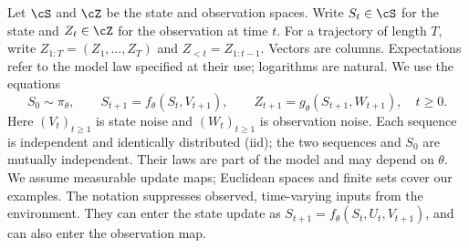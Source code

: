 \documentclass[11pt,twoside]{article}
\theoremstyle{definition}
\theoremstyle{remark}
\begin{document}
Let \(\cS\) and \(\cZ\) be the state and observation spaces. Write
\(S_t\in\cS\) for the state and \(Z_t\in\cZ\) for the observation at
time \(t\). For a trajectory of length \(T\), write
\(Z_{1:T}=(Z_1,\ldots,Z_T)\) and \(Z_{<t}=Z_{1:t-1}\).
Vectors are columns. Expectations refer to the model law specified at their
use; logarithms are natural. We use the equations
\begin{equation}
 S_0\sim\pi_\theta,\qquad
 S_{t+1}=f_\theta(S_t,V_{t+1}),\qquad
 Z_{t+1}=g_\theta(S_{t+1},W_{t+1}),\quad t\ge0.
 \label{eq:nonlinear-ssm}
\end{equation}
Here \((V_t)_{t\ge1}\) is state noise and \((W_t)_{t\ge1}\) is observation
noise. Each sequence is independent and identically distributed (iid);
the two sequences and \(S_0\) are mutually independent. Their laws are part of the model
and may depend on \(\theta\).
We assume measurable update maps; Euclidean spaces and finite sets cover
our examples.
The notation suppresses observed, time-varying inputs from the environment.
They can enter the state update as
\(S_{t+1}=f_\theta(S_t,U_t,V_{t+1})\), and can also enter the observation
map.
\end{document}
